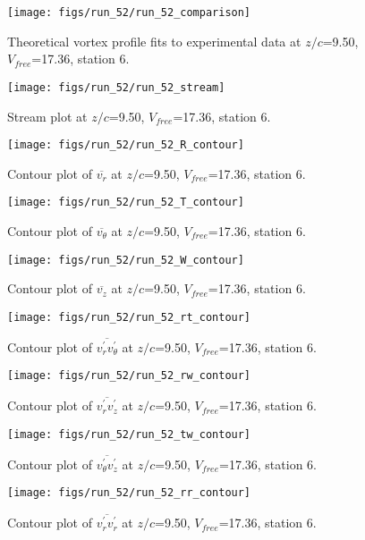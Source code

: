 \begin{figure}[H]
\centering
\texttt{[image: figs/run\_52/run\_52\_comparison]}
\caption{Theoretical vortex profile fits to experimental data at $z/c$=9.50, $V_{free}$=17.36, station 6.}
\end{figure}


\begin{figure}[H]
\centering
\texttt{[image: figs/run\_52/run\_52\_stream]}
\caption{Stream plot at $z/c$=9.50, $V_{free}$=17.36, station 6.}
\end{figure}


\begin{figure}[H]
\centering
\texttt{[image: figs/run\_52/run\_52\_R\_contour]}
\caption{Contour plot of $\overline{v_{r}}$ at $z/c$=9.50, $V_{free}$=17.36, station 6.}
\end{figure}


\begin{figure}[H]
\centering
\texttt{[image: figs/run\_52/run\_52\_T\_contour]}
\caption{Contour plot of $\overline{v_{\theta}}$ at $z/c$=9.50, $V_{free}$=17.36, station 6.}
\end{figure}


\begin{figure}[H]
\centering
\texttt{[image: figs/run\_52/run\_52\_W\_contour]}
\caption{Contour plot of $\overline{v_{z}}$ at $z/c$=9.50, $V_{free}$=17.36, station 6.}
\end{figure}


\begin{figure}[H]
\centering
\texttt{[image: figs/run\_52/run\_52\_rt\_contour]}
\caption{Contour plot of $\overline{v_{r}^{\prime} v_{\theta}^{\prime}}$ at $z/c$=9.50, $V_{free}$=17.36, station 6.}
\end{figure}


\begin{figure}[H]
\centering
\texttt{[image: figs/run\_52/run\_52\_rw\_contour]}
\caption{Contour plot of $\overline{v_{r}^{\prime} v_{z}^{\prime}}$ at $z/c$=9.50, $V_{free}$=17.36, station 6.}
\end{figure}


\begin{figure}[H]
\centering
\texttt{[image: figs/run\_52/run\_52\_tw\_contour]}
\caption{Contour plot of $\overline{v_{\theta}^{\prime} v_{z}^{\prime}}$ at $z/c$=9.50, $V_{free}$=17.36, station 6.}
\end{figure}


\begin{figure}[H]
\centering
\texttt{[image: figs/run\_52/run\_52\_rr\_contour]}
\caption{Contour plot of $\overline{v_{r}^{\prime} v_{r}^{\prime}}$ at $z/c$=9.50, $V_{free}$=17.36, station 6.}
\end{figure}


